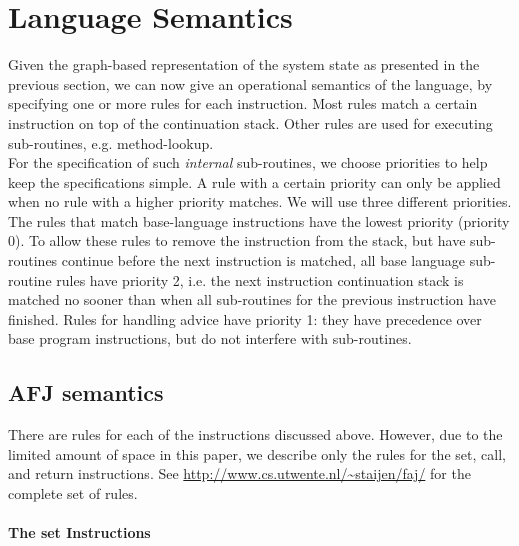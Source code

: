 \section{Language Semantics}\label{sec:gr-rules}

Given the graph-based representation of the system state as presented in the previous section, we can now give an operational semantics of the language, by specifying one or more rules for each instruction. Most rules match a certain instruction on top of the continuation stack. Other rules are used for executing sub-routines, e.g. method-lookup.\\
For the specification of such \emph{internal} sub-routines, we choose priorities to help keep the specifications simple. A rule with a certain priority can only be applied when no rule with a higher priority matches. We will use three different priorities. The rules that match base-language instructions have the lowest priority (priority 0). To allow these rules to remove the instruction from the stack, but have sub-routines continue before the next instruction is matched, all base language sub-routine rules have priority 2, i.e. the next instruction continuation stack is matched no sooner than when all sub-routines for the previous instruction have finished. Rules for handling advice have priority 1: they have precedence over base program instructions, but do not interfere with sub-routines. 

\subsection{AFJ semantics}

There are rules for each of the instructions discussed above. However, due to the limited amount of space in this paper, we describe only the rules for the {\sc set}, {\sc call}, and {\sc return} instructions. See \href{http://www.cs.utwente.nl/~staijen/faj/}{http://www.cs.utwente.nl/\~{}staijen/faj/} for the complete set of rules.

\paragraph{The {\sc set} Instructions}

